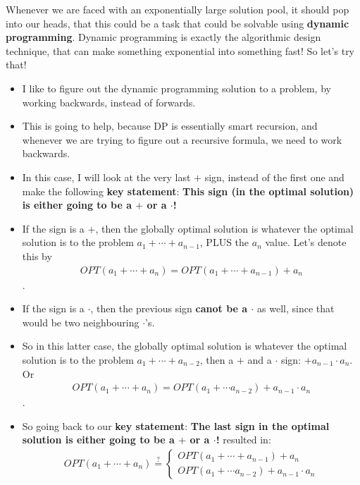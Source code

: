 Whenever we are faced with an exponentially large solution pool, it should pop into our heads, that this could be a task that could be solvable using \textbf{dynamic programming}. Dynamic programming is exactly the algorithmic design technique, that can make something exponential into something fast! So let's try that!

\begin{itemize}
    \item I like to figure out the dynamic programming solution to a problem, by working backwards, instead of forwards.
    \item This is going to help, because DP is essentially smart recursion, and whenever we are trying to figure out a recursive formula, we need to work backwards.
    \item In this case, I will look at the very last $+$ sign, instead of the first one and make the following \textbf{key statement}: \textbf{This sign (in the optimal solution) is either going to be a $+$ or a $\cdot{}$!}
    \item If the sign is a $+$, then the globally optimal solution is whatever the optimal solution is to the problem $a_1 + \cdots{} + a_{n-1}$, PLUS the $a_n$ value. Let's denote this by \begin{align*}OPT(a_1 + \cdots{} + a_n) = OPT(a_1 + \cdots{} + a_{n-1}) + a_n\end{align*}.
    \item If the sign is a $\cdot{}$, then the previous sign \textbf{canot be a $\cdot$} as well, since that would be two neighbouring $\cdot$'s.
    \item So in this latter case, the globally optimal solution is whatever the optimal solution is to the problem $a_1 + \cdots{} + a_{n-2}$, then a $+$ and a $\cdot{}$ sign: $+ a_{n-1}\cdot{}a_n$. Or \begin{align*}OPT(a_1 + \cdots{} + a_n) = OPT(a_1 + \cdots{} a_{n-2}) + a_{n-1} \cdot{} a_n\end{align*}.
    \item So going back to our \textbf{key statement}: \textbf{The last sign in the optimal solution is either going to be a $+$ or a $\cdot{}$!} resulted in: \begin{align*}OPT(a_1 + \cdots{} + a_n) \stackrel{?}{=} \begin{cases}OPT(a_1 + \cdots{} + a_{n-1}) + a_n \\ OPT(a_1 + \cdots{} a_{n-2}) + a_{n-1} \cdot{} a_n\end{cases}\end{align*}

\end{itemize}
